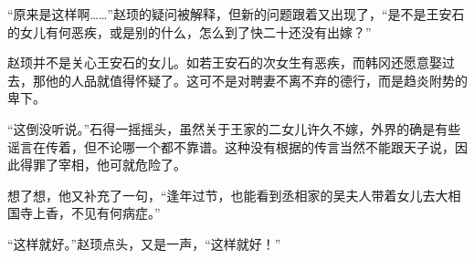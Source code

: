 “原来是这样啊……”赵顼的疑问被解释，但新的问题跟着又出现了，“是不是王安石的女儿有何恶疾，或是别的什么，怎么到了快二十还没有出嫁？”

赵顼并不是关心王安石的女儿。如若王安石的次女生有恶疾，而韩冈还愿意娶过去，那他的人品就值得怀疑了。这可不是对聘妻不离不弃的德行，而是趋炎附势的卑下。

“这倒没听说。”石得一摇摇头，虽然关于王家的二女儿许久不嫁，外界的确是有些谣言在传着，但不论哪一个都不靠谱。这种没有根据的传言当然不能跟天子说，因此得罪了宰相，他可就危险了。

想了想，他又补充了一句，“逢年过节，也能看到丞相家的吴夫人带着女儿去大相国寺上香，不见有何病症。”

“这样就好。”赵顼点头，又是一声，“这样就好！”

